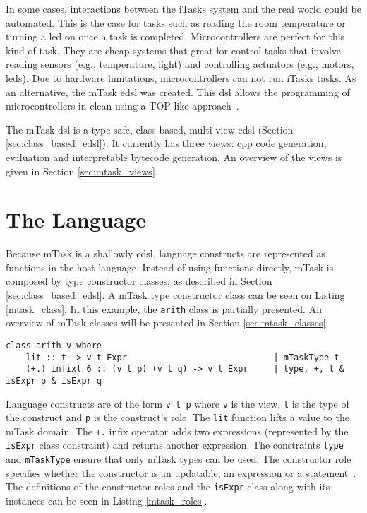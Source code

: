 In some cases, interactions between the iTasks system and the real world could be automated. This is the case for tasks such as reading the room temperature or turning a \acs{led} on once a task is completed. Microcontrollers are perfect for this kind of task. They are cheap systems that great for control tasks that involve reading sensors (e.g., temperature, light) and controlling actuators (e.g., motors, \acsp{led}). Due to hardware limitations, microcontrollers can not run \gls{iTasks} tasks. As an alternative, the mTask \ac{edsl} was created. This \ac{dsl} allows the programming of microcontrollers in \gls{clean} using a TOP-like approach~\cite{micro,mtasks,martthesis}.

The mTask \ac{dsl} is a type safe, class-based, multi-view \ac{edsl} (Section \ref{sec:class_based_edsl}). It currently has three views: \gls{cpp} code generation, evaluation and interpretable bytecode generation. An overview of the views is given in Section \ref{sec:mtask_views}.

\section{The Language}
Because mTask is a shallowly \ac{edsl}, language constructs are represented as functions in the host language. Instead of using functions directly, mTask is composed by type constructor classes, as described in Section \ref{sec:class_based_edsl}. A \gls{mTask} type constructor class can be seen on Listing \ref{mtask_class}. In this example, the \texttt{arith} class is partially presented. An overview of \gls{mTask} classes will be presented in Section \ref{sec:mtask_classes}.

\begin{lstlisting}[caption=A \gls{mTask} class,captionpos=b,label=mtask_class]
class arith v where
    lit :: t -> v t Expr                             | mTaskType t                       
    (+.) infixl 6 :: (v t p) (v t q) -> v t Expr     | type, +, t & isExpr p & isExpr q
\end{lstlisting}

Language constructs are of the form \texttt{v t p} where \texttt{v} is the view, \texttt{t} is the type of the construct and \texttt{p} is the construct's role. The \texttt{lit} function lifts a value to the mTask domain. The \texttt{+.} infix operator adds two expressions (represented by the \texttt{isExpr} class constraint) and returns another expression. The constraints \texttt{type} and \texttt{mTaskType} ensure that only \gls{mTask} types can be used. The constructor role specifies whether the constructor is an updatable, an expression or a statement~\cite{mtasks,martthesis}. The definitions of the constructor roles and the \texttt{isExpr} class along with its instances can be seen in Listing \ref{mtask_roles}.

